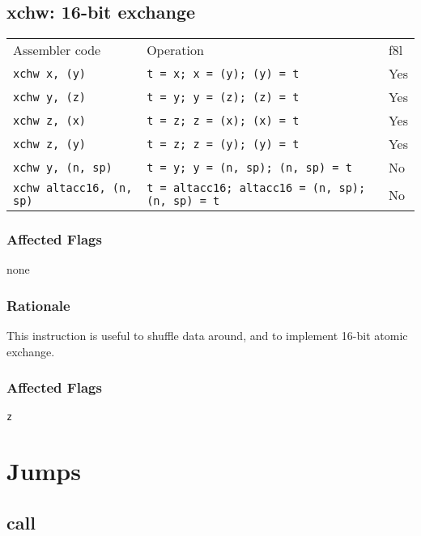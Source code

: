 \documentclass{book}
\begin{document}
\subsection{xchw: 16-bit exchange}

\begin{tabular}{l l l}
Assembler code                  & Operation                                              & f8l \\
\texttt{xchw x, (y)}            & \texttt{t = x; x = (y); (y) = t}                       & Yes \\
\texttt{xchw y, (z)}            & \texttt{t = y; y = (z); (z) = t}                       & Yes \\
\texttt{xchw z, (x)}            & \texttt{t = z; z = (x); (x) = t}                       & Yes \\
\texttt{xchw z, (y)}            & \texttt{t = z; z = (y); (y) = t}                       & Yes \\
\texttt{xchw y, (n, sp)}        & \texttt{t = y; y = (n, sp); (n, sp) = t}               & No \\
\texttt{xchw altacc16, (n, sp)} & \texttt{t = altacc16; altacc16 = (n, sp); (n, sp) = t} & No \\
\end{tabular}

\subsubsection*{Affected Flags}

none

\subsubsection*{Rationale}

This instruction is useful to shuffle data around, and to implement 16-bit atomic exchange.


\subsubsection*{Affected Flags}

\texttt{z}


\section{Jumps}

\subsection{call}
\end{document}
